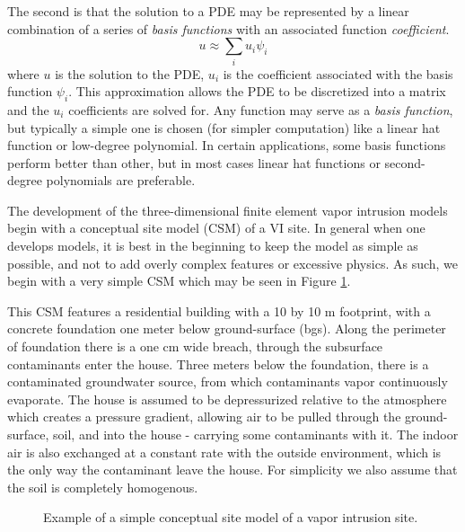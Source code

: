 The second is that the solution to a PDE may be represented by a linear combination of a series of \textit{basis functions} with an associated function \textit{coefficient}.
\begin{equation}
  u \approx \sum_i u_i \psi_i
\end{equation}
where $u$ is the solution to the PDE, $u_i$ is the coefficient associated with the basis function $\psi_i$.
This approximation allows the PDE to be discretized into a matrix and the $u_i$ coefficients are solved for.
Any function may serve as a \textit{basis function}, but typically a simple one is chosen (for simpler computation) like a linear hat function or low-degree polynomial.
In certain applications, some basis functions perform better than other, but in most cases linear hat functions or second-degree polynomials are preferable.\par


The development of the three-dimensional finite element vapor intrusion models begin with a conceptual site model (CSM) of a VI site.
In general when one develops models, it is best in the beginning to keep the model as simple as possible, and not to add overly complex features or excessive physics.
As such, we begin with a very simple CSM which may be seen in Figure \ref{fig:csm}.\par

This CSM features a residential building with a 10 by 10 m footprint, with a concrete foundation one meter below ground-surface (bgs).
Along the perimeter of foundation there is a one cm wide breach, through the subsurface contaminants enter the house.
Three meters below the foundation, there is a contaminated groundwater source, from which contaminants vapor continuously evaporate.
The house is assumed to be depressurized relative to the atmosphere which creates a pressure gradient, allowing air to be pulled through the ground-surface, soil, and into the house - carrying some contaminants with it.
The indoor air is also exchanged at a constant rate with the outside environment, which is the only way the contaminant leave the house.
For simplicity we also assume that the soil is completely homogenous.\par

\begin{figure} %
  \caption{Example of a simple conceptual site model of a vapor intrusion site.}
  \label{fig:csm}
\end{figure}

